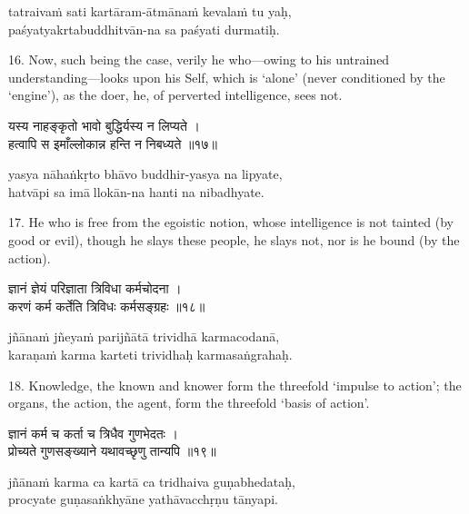 \begin{transliteration}
tatraivaṁ sati kartāram-ātmānaṁ kevalaṁ tu yaḥ, \\
paśyatyakrtabuddhitvān-na sa paśyati durmatiḥ.
\end{transliteration}

16. Now, such being the case, verily he who---owing to his untrained
understanding---looks upon his Self, which is `alone' (never conditioned by the
`engine'), as the doer, he, of perverted intelligence, sees not.

\begin{gitaverse}
यस्य नाहङ्कृतो भावो बुद्धिर्यस्य न लिप्यते । \\
हत्वापि स इमाँल्लोकान्न हन्ति न निबध्यते ॥१७॥
\end{gitaverse}

\begin{transliteration}
yasya nāhaṅkṛto bhāvo buddhir-yasya na lipyate, \\
hatvāpi sa imāllokān-na hanti na nibadhyate.
\end{transliteration}

17. He who is free from the egoistic notion, whose intelligence is not tainted
(by good or evil), though he slays these people, he slays not, nor is he bound
(by the action).

\begin{gitaverse}
ज्ञानं ज्ञेयं परिज्ञाता त्रिविधा कर्मचोदना । \\
करणं कर्म कर्तेति त्रिविधः कर्मसङ्ग्रहः ॥१८॥
\end{gitaverse}

\begin{transliteration}
jñānaṁ jñeyaṁ parijñātā trividhā karmacodanā, \\
karaṇaṁ karma karteti trividhaḥ karmasaṅgrahaḥ.
\end{transliteration}

18. Knowledge, the known and knower form the threefold `impulse to action'; the
organs, the action, the agent, form the threefold `basis of action'.

\begin{gitaverse}
ज्ञानं कर्म च कर्ता च त्रिधैव गुणभेदतः । \\
प्रोच्यते गुणसङ्ख्याने यथावच्छृणु तान्यपि ॥१९॥
\end{gitaverse}

\begin{transliteration}
jñānaṁ karma ca kartā ca tridhaiva guṇabhedataḥ, \\
procyate guṇasaṅkhyāne yathāvacchṛṇu tānyapi.
\end{transliteration}

